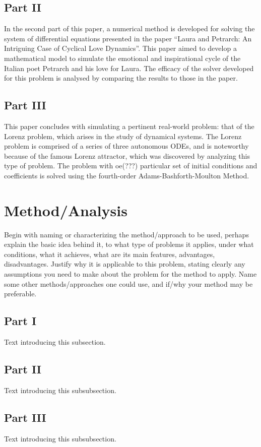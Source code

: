 \documentclass[11pt]{article}
\begin{document}
\subsection{Part II}\label{S:2.2}
%
In the second part of this paper, a numerical method is developed for solving the
system of differential equations presented in the paper “Laura and Petrarch: An 
Intriguing Case of Cyclical Love Dynamics”. This paper aimed to develop a mathematical
model to simulate the emotional and inspirational cycle of the Italian poet Petrarch
and his love for Laura. The efficacy of the solver developed for this problem is
analysed by comparing the results to those in the paper.
\subsection{Part III}\label{S:2.3}
%
This paper concludes with simulating a pertinent real-world problem: that of the 
Lorenz problem, which arises in the study of dynamical systems. The Lorenz problem
is comprised of a series of three autonomous ODEs, and is noteworthy because of
the famous Lorenz attractor, which was discovered by analyzing this type of 
problem. The problem with oe(???) particular set of initial conditions and coefficients
is solved using the fourth-order Adams-Bashforth-Moulton Method.
\section{Method/Analysis}\label{S:3}
Begin with naming or characterizing the method/approach to be used, perhaps explain
the basic idea behind it, to what type of problems it applies, under what 
conditions, what it achieves, what are its main features, advantages, 
disadvantages. Justify why it is applicable to this problem, stating clearly any 
assumptions you need to make about the problem for the method to apply. Name some 
other methods/approaches one could use, and if/why your method may be preferable.
\subsection{Part I}
%
Text introducing this subsection. 
\subsection{Part II}
%
Text introducing this subsubsection. 
\subsection{Part III}
%
Text introducing this subsubsection. 
\end{document}
